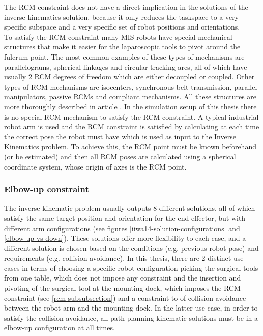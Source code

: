 The RCM constraint does not have a direct implication in the solutions of the inverse kinematics solution, because it only reduces the taskspace to a very specific subspace and a very specific set of robot positions 
and orientations.\\

To satisfy the RCM constraint many MIS robots have special mechanical structures that make it easier for the laparoscopic tools to pivot around the fulcrum point. The most common examples of these types of mechanisms 
are parallelograms, spherical linkages and circular tracking arcs, all of which have usually 2 RCM degrees of freedom which are either decoupled or coupled. Other types of RCM mechanisms are isocenters, 
synchronous belt transmission, parallel manipulators, passive RCMs and compliant mechanisms. All these structures are more thoroughly described in article \cite{dai2009HIstoricalMISKinematicsRCM}. In the simulation setup 
of this thesis there is no special RCM mechanism to satisfy the RCM constraint. A typical industrial robot arm is used and the RCM constraint is satisfied by calculating at each time the correct pose the robot must have 
which is used as input to the Inverse Kinematics problem. To achieve this, the RCM point must be known beforehand (or be estimated) and then all RCM poses are calculated using a spherical coordinate system, whose origin 
of axes is the RCM point.


\subsubsection{Elbow-up constraint}
\label{section-elbow-up-constraints}

The inverse kinematic problem usually outputs 8 different solutions, all of which satisfy the same target position and orientation for the end-effector, but with different arm configurations (see figures 
\ref{iiwa14-solution-configurations} and \ref{elbow-up-vs-down}). These solutions offer more flexibility to each case, and a different solution is chosen based on the conditions (e.g. previous robot pose) and 
requirements (e.g. collision avoidance). In this thesis, there are 2 distinct use cases in terms of choosing a specific robot configuration picking the surgical tools from one table, which does not impose any constraint
and the insertion and pivoting of the surgical tool at the mounting dock, which imposes the RCM constraint (see \ref{rcm-subsubsection}) and a constraint to of collision avoidance between the robot arm and the mounting dock.
In the latter use case, in order to satisfy the collision avoidance, all path planning kinematic solutions must be in a elbow-up configuration at all times.


